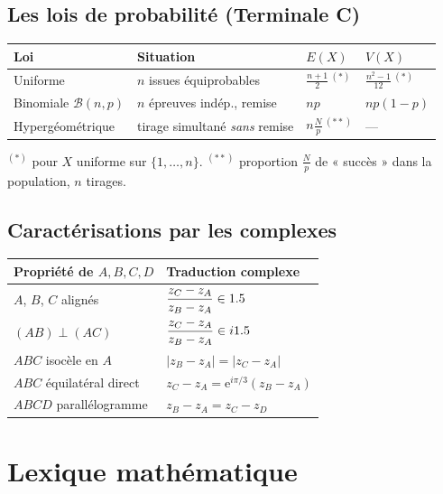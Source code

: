 \subsection{Les lois de probabilité (Terminale C)}
\begin{center}\small
\begin{tabular}{@{}p{3cm}p{4.6cm}p{2.2cm}p{2.6cm}@{}}
\toprule
\textbf{Loi} & \textbf{Situation} & \textbf{$E(X)$} & \textbf{$V(X)$}\\
\midrule
Uniforme & $n$ issues équiprobables & $\frac{n+1}2$\,$^{(*)}$ & $\frac{n^2-1}{12}$\,$^{(*)}$\\[3pt]
Binomiale $\mathcal B(n,p)$ & $n$ épreuves indép., remise & $np$ & $np(1-p)$\\[3pt]
Hypergéométrique & tirage simultané \emph{sans} remise & $n\frac Np$\,$^{(**)}$ & —\\
\bottomrule
\end{tabular}
\end{center}
\noindent\footnotesize $^{(*)}$ pour $X$ uniforme sur $\{1,\dots,n\}$. \quad
$^{(**)}$ proportion $\frac Np$ de « succès » dans la population, $n$ tirages.\normalsize

\subsection{Caractérisations par les complexes}
\begin{center}\small
\begin{tabular}{@{}ll@{}}
\toprule
\textbf{Propriété de} $A,B,C,D$ & \textbf{Traduction complexe}\\
\midrule
$A$, $B$, $C$ alignés & $\dfrac{z_C-z_A}{z_B-z_A}\in1.5$\\[6pt]
$(AB)\perp(AC)$ & $\dfrac{z_C-z_A}{z_B-z_A}\in i1.5$\\[6pt]
$ABC$ isocèle en $A$ & $|z_B-z_A|=|z_C-z_A|$\\[6pt]
$ABC$ équilatéral direct & $z_C-z_A=\mathrm{e}^{i\pi/3}(z_B-z_A)$\\[6pt]
$ABCD$ parallélogramme & $z_B-z_A=z_C-z_D$\\
\bottomrule
\end{tabular}
\end{center}

\section{Lexique mathématique}


